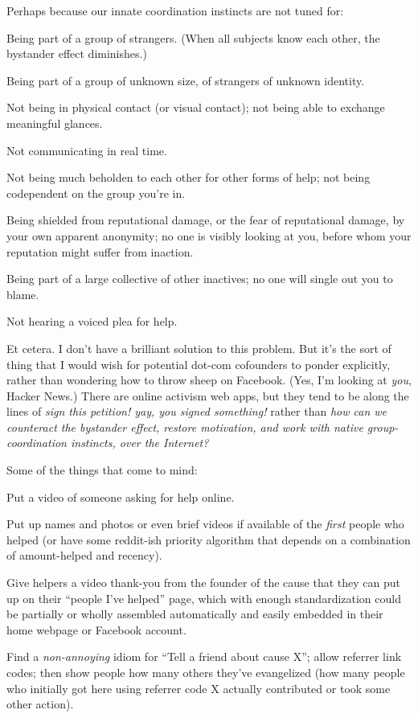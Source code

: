 {
 Perhaps because our innate coordination instincts are not tuned
for:}

{
 Being part of a group of strangers. (When all subjects know each
other, the bystander effect diminishes.)}

{
 Being part of a group of unknown size, of strangers of unknown
identity.}

{
 Not being in physical contact (or visual contact); not being able
to exchange meaningful glances.}

{
 Not communicating in real time.}

{
 Not being much beholden to each other for other forms of help; not
being codependent on the group you're in.}

{
 Being shielded from reputational damage, or the fear of
reputational damage, by your own apparent anonymity; no one is visibly
looking at you, before whom your reputation might suffer from
inaction.}

{
 Being part of a large collective of other inactives; no one will
single out you to blame.}

{
 Not hearing a voiced plea for help.}

{
 Et cetera. I don't have a brilliant solution to
this problem. But it's the sort of thing that I would
wish for potential dot-com cofounders to ponder explicitly, rather than
wondering how to throw sheep on Facebook. (Yes, I'm
looking at \textit{you}, Hacker News.) There are online activism web
apps, but they tend to be along the lines of \textit{sign this
petition! yay, you signed something!} rather than \textit{how can we
counteract the bystander effect, restore motivation, and work with
native group-coordination instincts, over the Internet?}}

{
 Some of the things that come to mind:}

{
 Put a video of someone asking for help online.}

{
 Put up names and photos or even brief videos if available of the
\textit{first} people who helped (or have some reddit-ish priority
algorithm that depends on a combination of amount-helped and recency).}

{
 Give helpers a video thank-you from the founder of the cause that
they can put up on their ``people I've
helped'' page, which with enough standardization
could be partially or wholly assembled automatically and easily
embedded in their home webpage or Facebook account.}

{
 Find a \textit{non-annoying} idiom for ``Tell a
friend about cause X''; allow referrer link codes;
then show people how many others they've evangelized
(how many people who initially got here using referrer code X actually
contributed or took some other action).}

